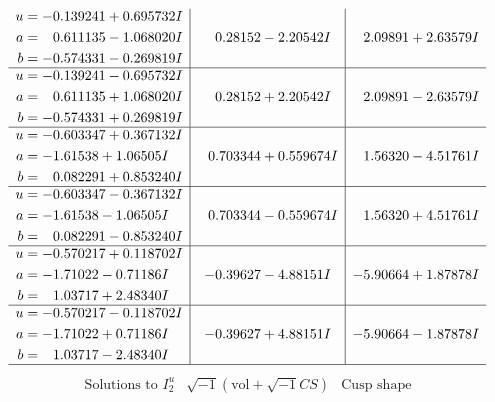 \documentclass[1p]{elsarticle_modified}
\theoremstyle{definition}
\newcommand{\I}{\sqrt{-1}}
\begin{document}
$$\begin{array}{c|c|c}
\begin{aligned}
u &= -0.139241 + 0.695732 I \\
a &= \phantom{-}0.611135 - 1.068020 I \\
b &= -0.574331 - 0.269819 I\end{aligned}
 & \phantom{-}0.28152 - 2.20542 I & \phantom{-}2.09891 + 2.63579 I \\ \hline\begin{aligned}
u &= -0.139241 - 0.695732 I \\
a &= \phantom{-}0.611135 + 1.068020 I \\
b &= -0.574331 + 0.269819 I\end{aligned}
 & \phantom{-}0.28152 + 2.20542 I & \phantom{-}2.09891 - 2.63579 I \\ \hline\begin{aligned}
u &= -0.603347 + 0.367132 I \\
a &= -1.61538 + 1.06505 I \\
b &= \phantom{-}0.082291 + 0.853240 I\end{aligned}
 & \phantom{-}0.703344 + 0.559674 I & \phantom{-}1.56320 - 4.51761 I \\ \hline\begin{aligned}
u &= -0.603347 - 0.367132 I \\
a &= -1.61538 - 1.06505 I \\
b &= \phantom{-}0.082291 - 0.853240 I\end{aligned}
 & \phantom{-}0.703344 - 0.559674 I & \phantom{-}1.56320 + 4.51761 I \\ \hline\begin{aligned}
u &= -0.570217 + 0.118702 I \\
a &= -1.71022 - 0.71186 I \\
b &= \phantom{-}1.03717 + 2.48340 I\end{aligned}
 & -0.39627 - 4.88151 I & -5.90664 + 1.87878 I \\ \hline\begin{aligned}
u &= -0.570217 - 0.118702 I \\
a &= -1.71022 + 0.71186 I \\
b &= \phantom{-}1.03717 - 2.48340 I\end{aligned}
 & -0.39627 + 4.88151 I & -5.90664 - 1.87878 I\\
 \hline 
 \end{array}$$\newpage$$\begin{array}{c|c|c}  
\text{Solutions to }I^u_{2}& \I (\text{vol} + \sqrt{-1}CS) & \text{Cusp shape}\\
 \hline 
\begin{aligned}

\end{aligned}
\end{array}$$
\end{document}
